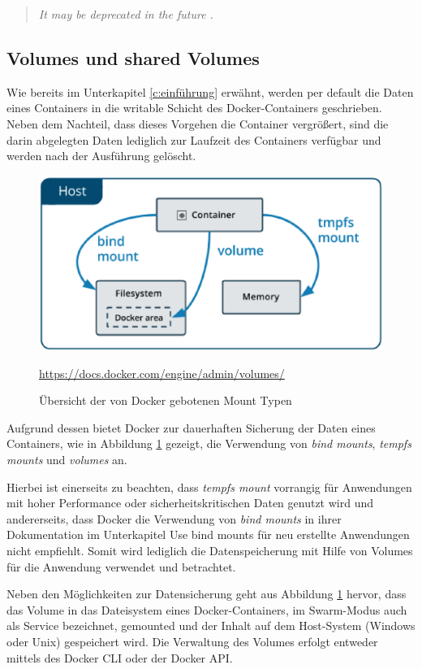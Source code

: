 \begin{quote}
	\textit{\glqq{}It may be deprecated in the future \cite{Docker:online3}.\grqq{}}
\end{quote}

\subsection{Volumes und shared Volumes}
\label{ss:sharedVolumes}
Wie bereits im Unterkapitel \ref{c:einführung} erwähnt, werden per default die Daten eines Containers in die writable Schicht des Docker-Containers geschrieben. 
Neben dem Nachteil, dass dieses Vorgehen die Container vergrößert, sind die darin abgelegten Daten lediglich zur Laufzeit des Containers verfügbar und werden nach der Ausführung gelöscht.

\begin{figure}
	\centering
	\includegraphics[width=0.7\linewidth]{figures/DockerMounts}
	\caption[Docker Mount Typen]{Übersicht der von Docker gebotenen Mount Typen}
	\label{fig:dockermounts}
	\tiny{\quelle\url{https://docs.docker.com/engine/admin/volumes/}}
\end{figure}

Aufgrund dessen bietet Docker zur dauerhaften Sicherung der Daten eines Containers, wie in Abbildung \ref{fig:dockermounts} gezeigt, die Verwendung von \textit{bind mounts}, \textit{tempfs mounts} und \textit{volumes} an.

Hierbei ist einerseits zu beachten, dass \textit{tempfs mount} vorrangig für Anwendungen mit hoher Performance oder sicherheitskritischen Daten genutzt wird und andererseits, dass Docker die Verwendung von \textit{bind mounts} in ihrer Dokumentation im Unterkapitel \glqq{}Use bind mounts\grqq{} für neu erstellte Anwendungen nicht empfiehlt. 
Somit wird lediglich die Datenspeicherung mit Hilfe von Volumes für die Anwendung verwendet und betrachtet.

Neben den Möglichkeiten zur Datensicherung geht aus Abbildung \ref{fig:dockermounts} hervor, dass das Volume in das Dateisystem eines Docker-Containers, im Swarm-Modus auch als Service bezeichnet, gemounted und der Inhalt auf dem Host-System (Windows oder Unix) gespeichert wird. 
Die Verwaltung des Volumes erfolgt entweder mittels des Docker \ac{CLI} oder der Docker API.

